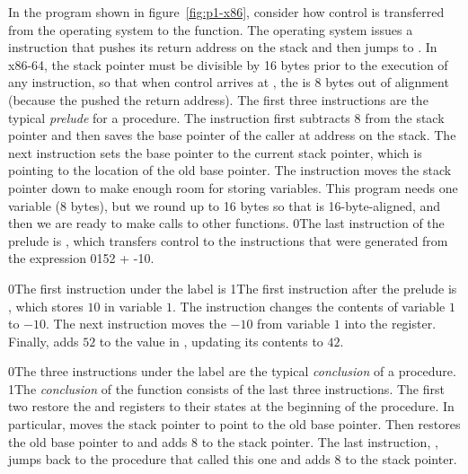 \documentclass[7x10]{TimesAPriori_MIT}%
\def\racketEd{0}
\def\pythonEd{1}
\def\edition{1}
\newcommand{\racket}[1]{{\if\edition\racketEd{#1}\fi}}
\newcommand{\pythonColor}[0]{}
\newcommand{\python}[1]{{\if\edition\pythonEd\pythonColor #1\fi}}
\numberwithin{theorem}{chapter}
\numberwithin{definition}{chapter}
\numberwithin{equation}{chapter}
\begin{document}
In the program shown in figure~\ref{fig:p1-x86}, consider how control
is transferred from the operating system to the  function.
The operating system issues a  instruction that
pushes its return address on the stack and then jumps to
. In x86-64, the stack pointer  must be divisible
by 16 bytes prior to the execution of any  instruction, so
that when control arrives at , the  is 8 bytes
out of alignment (because the  pushed the return address).
The first three instructions are the typical
\emph{prelude} for a procedure.  The
instruction  first subtracts $8$ from the stack
pointer  and then saves the base pointer of the caller at
address  on the stack. The next instruction  sets the base pointer to the current stack pointer,
which is pointing to the location of the old base pointer. The
instruction  moves the stack pointer down to
make enough room for storing variables.  This program needs one
variable ($8$ bytes), but we round up to 16 bytes so that  is
16-byte-aligned, and then we are ready to make calls to other functions.
\racket{The last instruction of the prelude is , which
  transfers control to the instructions that were generated from the
  expression \racket{\code{(+ 52 (- 10))}}\python{52 + -10}.}

\racket{The first instruction under the  label is}
%
\python{The first instruction after the prelude is}
%
, which stores $10$ in variable $1$.
%
The instruction  changes the contents of variable
$1$ to $-10$.
%
The next instruction moves the $-10$ from variable $1$ into the
 register.  Finally,  adds $52$ to
the value in , updating its contents to $42$.

\racket{The three instructions under the label  are the
  typical \emph{conclusion} of a procedure.}
%
\python{The \emph{conclusion}\index{subject}{conclusion} of the
  \code{main} function consists of the last three instructions.}
%
The first two restore the  and  registers to their
states at the beginning of the procedure. In particular,
 moves the stack pointer to point to the
old base pointer. Then  restores the old base pointer
to  and adds $8$ to the stack pointer.  The last instruction,
, jumps back to the procedure that called this one and adds
$8$ to the stack pointer.
\end{document}
